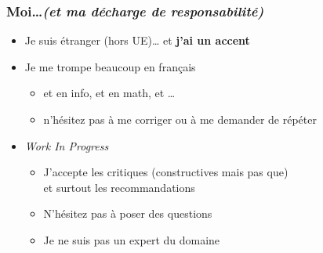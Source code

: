 \documentclass[12pt,svgnames]{beamer}
\subtitle{\Huge Introduction et Rappel}
\date{CM0}
\begin{document}
\begin{frame}
	\titlepage
\end{frame}


\begin{frame}
	\frametitle{Moi\ldots \textit{\small (et ma décharge de responsabilité)}}
	\begin{itemize}
		\item Je suis étranger (hors UE)… et \textbf{j'ai un accent}
		\item Je me {\color{blue} trompe beaucoup} en français
		\begin{itemize}
			\item et en info, et en math, et \ldots
			\item n'hésitez pas à me corriger ou à me demander de répéter
		\end{itemize}
		\item \textit{Work In Progress}
		\begin{itemize}
			\item J'accepte les critiques (constructives mais pas que)\\
			et surtout les recommandations
			\item N'hésitez pas à poser des questions
			\item Je ne suis pas un expert du domaine
		\end{itemize}
	\end{itemize}
\end{frame}
\end{document}
